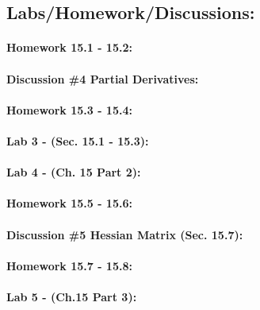 \documentclass[9pt]{amsart}
\begin{document}
    \subsection{Labs/Homework/Discussions:}
        \paragraph{Homework 15.1 - 15.2:}
            

        \paragraph{Discussion \#4 Partial Derivatives:}
            

        \paragraph{Homework 15.3 - 15.4:}
            
        \newpage
        \paragraph{Lab 3 - (Sec. 15.1 - 15.3):}
            
        \newpage
        \paragraph{Lab 4 - (Ch. 15 Part 2):}
            

        \paragraph{Homework 15.5 - 15.6:}
            

        \paragraph{Discussion \#5 Hessian Matrix (Sec. 15.7):}
            

        \paragraph{Homework 15.7 - 15.8:}
            
        \newpage
        \paragraph{Lab 5 - (Ch.15 Part 3):}
            
\end{document}

